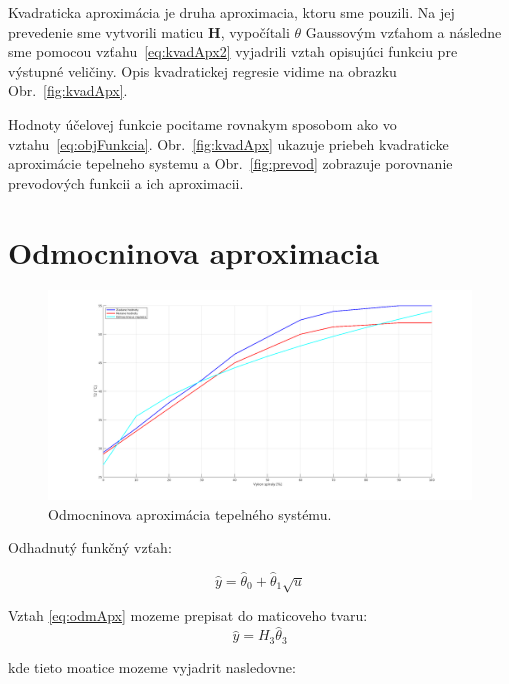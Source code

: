 \documentclass{article}
\begin{document}
Kvadraticka aproximácia je druha aproximacia, ktoru sme pouzili.
Na jej prevedenie sme vytvorili maticu \textbf{H}, vypočítali
\(\theta\) Gaussovým vzťahom a následne sme pomocou vzťahu~\ref{eq:kvadApx2}
vyjadrili vztah opisujúci funkciu pre výstupné veličiny. Opis kvadratickej
regresie vidime na obrazku Obr.~\ref{fig:kvadApx}.

Hodnoty účelovej funkcie pocitame rovnakym sposobom ako vo vztahu~\ref{eq:objFunkcia}.
Obr.~\ref{fig:kvadApx} ukazuje priebeh kvadraticke aproximácie tepelneho systemu a
Obr.~\ref{fig:prevod} zobrazuje porovnanie prevodových funkcii a ich aproximacii.

\clearpage

\section{Odmocninova aproximacia}
\label{sec:odm}

\begin{figure}[!htbp]
	\begin{center}
		\includegraphics[width=\textwidth]{include/odmocninova_regresia.png}
	\end{center}
	\caption{Odmocninova aproximácia tepelného systému.}
	\label{fig:odmApx}
\end{figure}

Odhadnutý funkčný vzťah:

\begin{equation}
	\hat{y} = \hat{\theta}_0 + \hat{\theta}_1 \sqrt{u}
	\label{eq:odmApx}
\end{equation}

Vztah \ref{eq:odmApx} mozeme prepisat do maticoveho tvaru:
\begin{equation}
	\hat{y} = H_3\hat{\theta}_3
	\label{eq:odmApx2}
\end{equation}

kde tieto moatice mozeme vyjadrit nasledovne:
\end{document}

